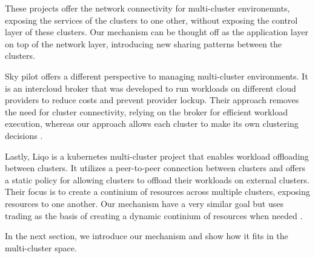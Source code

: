 These projects offer the network connectivity for multi-cluster environemnts,
exposing the services of the clusters to one other, without exposing the
control layer of these clusters. Our mechanism can be thought off as the application layer on top of the network layer, introducing new sharing patterns between the clusters.

Sky pilot offers a different perspective to managing multi-cluster
environments. It is an intercloud broker that was developed to run workloads on
different cloud providers to reduce costs and prevent provider lockup. Their
approach removes the need for cluster connectivity, relying on the
broker for efficient workload execution, whereas our approach allows each
cluster to make its own clustering decisions \cite{yang_skypilot_nodate}.

Lastly, Liqo is a kubernetes multi-cluster project that enables workload
offloading between clusters. It utilizes a peer-to-peer connection between
clusters and offers a static policy for allowing clusters to offload their
workloads on external clusters. Their focus is to create a continium of
resources across multiple clusters, exposing resources to one another. Our
mechanism have a very similar goal but uses trading as the basis of creating a
dynamic continium of resources when needed \cite{iorio_computing_2023,
noauthor_liqo_nodate}. 

In the next section, we introduce our mechanism and show how it fits in the
multi-cluster space.
